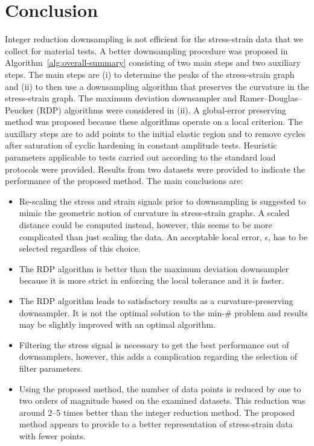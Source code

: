 \documentclass[a4paper,11pt]{article}
\begin{document}
\section{Conclusion}

Integer reduction downsampling is not efficient for the stress-strain data that we collect for material tests.
A better downsampling procedure was proposed in Algorithm~\ref{alg:overall-summary} consisting of two main steps and two auxiliary steps.
The main steps are (i) to determine the peaks of the stress-strain graph and (ii) to then use a downsampling algorithm that preserves the curvature in the stress-strain graph.
The maximum deviation downsampler and Ramer–Douglas–Peucker (RDP) algorithms were considered in (ii).
A global-error preserving method was proposed because these algorithms operate on a local criterion.
The auxillary steps are to add points to the initial elastic region and to remove cycles after saturation of cyclic hardening in constant amplitude tests.
Heuristic parameters applicable to tests carried out according to the standard load protocols were provided.
Results from two datasets were provided to indicate the performance of the proposed method.
The main conclusions are:
\begin{itemize}
    \item Re-scaling the stress and strain signals prior to downsampling is suggested to mimic the geometric notion of curvature in stress-strain graphs. A scaled distance could be computed instead, however, this seems to be more complicated than just scaling the data. An acceptable local error, $\epsilon$, has to be selected regardless of this choice.
    \item The RDP algorithm is better than the maximum deviation downsampler because it is more strict in enforcing the local tolerance and it is faster.
    \item The RDP algorithm leads to satisfactory results as a curvature-preserving downsampler. It is not the optimal solution to the min-\# problem and results may be slightly improved with an optimal algorithm.
    \item Filtering the stress signal is necessary to get the best performance out of downsamplers, however, this adds a complication regarding the selection of filter parameters.
    \item Using the proposed method, the number of data points is reduced by one to two orders of magnitude based on the examined datasets. This reduction was around 2--5 times better than the integer reduction method. The proposed method appears to provide to a better representation of stress-strain data with fewer points.
\end{itemize}




\end{document}
